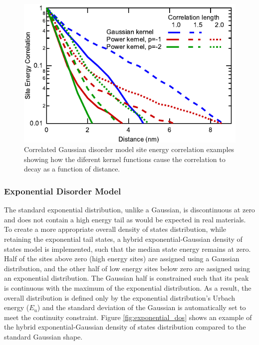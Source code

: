 \documentclass[%
 reprint,onecolumn,notitlepage,
superscriptaddress,longbibliography,
 amsmath,amssymb,
 aps,rmp,floatfix,
]{revtex4-1}
\begin{document}
\begin{figure}[h]
    \centering
    \includegraphics{DOS_correlation_comparison.pdf}
    \caption{Correlated Gaussian disorder model site energy correlation examples showing how the diferent kernel functions cause the correlation to decay as a function of distance.}
    \label{fig:correlation_data}
\end{figure}

\subsubsection{Exponential Disorder Model}

The standard exponential distribution, unlike a Gaussian, is discontinuous at zero and does not contain a high energy tail as would be expected in real materials.
To create a more appropriate overall density of states distribution, while retaining the exponential tail states, a hybrid exponential-Gaussian density of states model is implemented, such that the median state energy remains at zero.
Half of the sites above zero (high energy sites) are assigned using a Gaussian distribution, and the other half of low energy sites below zero are assigned using an exponential distribution.
The Gaussian half is constrained such that its peak is continuous with the maximum of the exponential distribution.
As a result, the overall distribution is defined only by the exponential distribution's Urbach energy ($E_\text{u}$) and the standard deviation of the Gaussian is automatically set to meet the continuity constraint.
Figure \ref{fig:exponential_dos} shows an example of the hybrid exponential-Gaussian density of states distribution compared to the standard Gaussian shape.
\end{document}
